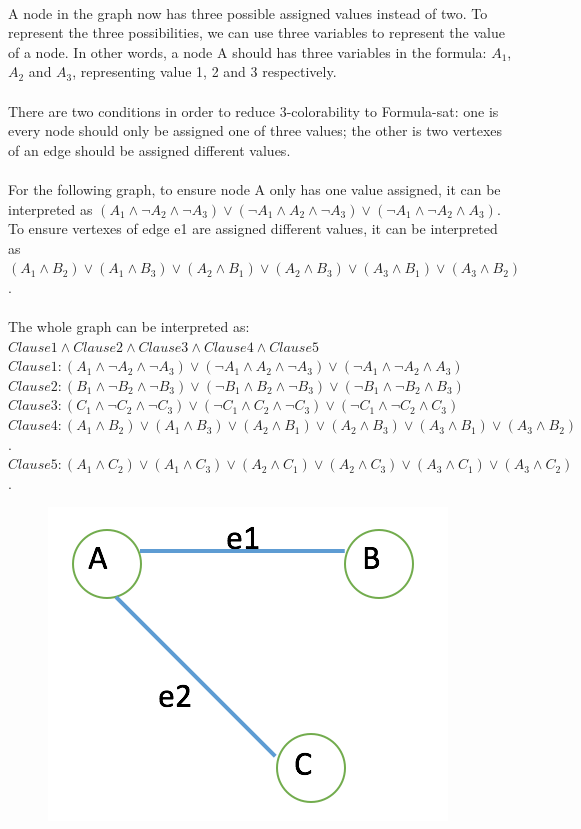 \begin{problem}{2} ~\\
A node in the graph now has three possible assigned values instead of two. To represent the three possibilities, we can use three variables to represent the value of a node. In other words, a node A should has three variables in the formula: $A_1$, $A_2$ and $A_3$, representing value 1, 2 and 3 respectively.\\
\\
There are two conditions in order to reduce 3-colorability to Formula-sat: one is every node should only be assigned one of three values; the other is two vertexes of an edge should be assigned different values.\\
\\
For the following graph, to ensure node A only has one value assigned, it can be interpreted as $(A_1 \wedge \neg A_2 \wedge \neg A_3) \lor (\neg A_1 \wedge A_2 \wedge \neg A_3) \lor (\neg A_1 \wedge \neg A_2 \wedge A_3)$. To ensure vertexes of edge e1 are assigned different values, it can be interpreted as $(A_1 \wedge B_2) \lor (A_1 \wedge B_3) \lor (A_2 \wedge B_1) \lor (A_2 \wedge B_3) \lor (A_3 \wedge B_1) \lor (A_3 \wedge B_2)$.\\
\\
The whole graph can be interpreted as: $Clause 1 \wedge Clause 2 \wedge Clause 3 \wedge Clause 4 \wedge Clause 5$\\
\tab $Clause 1: (A_1 \wedge \neg A_2 \wedge \neg A_3) \lor (\neg A_1 \wedge A_2 \wedge \neg A_3) \lor (\neg A_1 \wedge \neg A_2 \wedge A_3)$\\
\tab $Clause 2: (B_1 \wedge \neg B_2 \wedge \neg B_3) \lor (\neg B_1 \wedge B_2 \wedge \neg B_3) \lor (\neg B_1 \wedge \neg B_2 \wedge B_3)$\\
\tab $Clause 3: (C_1 \wedge \neg C_2 \wedge \neg C_3) \lor (\neg C_1 \wedge C_2 \wedge \neg C_3) \lor (\neg C_1 \wedge \neg C_2 \wedge C_3)$\\
\tab $Clause 4: (A_1 \wedge B_2) \lor (A_1 \wedge B_3) \lor (A_2 \wedge B_1) \lor (A_2 \wedge B_3) \lor (A_3 \wedge B_1) \lor (A_3 \wedge B_2)$.\\
\tab $Clause 5: (A_1 \wedge C_2) \lor (A_1 \wedge C_3) \lor (A_2 \wedge C_1) \lor (A_2 \wedge C_3) \lor (A_3 \wedge C_1) \lor (A_3 \wedge C_2)$.
\begin{figure}[H] 
\centering \includegraphics[width=0.4\columnwidth]{1_2}
\end{figure}
\end{problem}